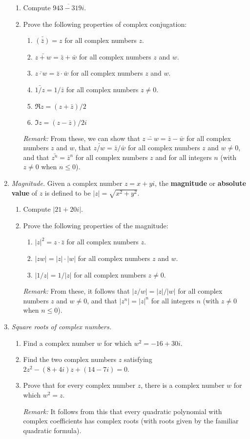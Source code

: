 \begin{enumerate}
\begin{enumerate}
\item Compute $\overline{943 - 319i}$.
\item Prove the following properties of complex conjugation:
\begin{enumerate}
\item $\bar{(\bar{z})} = z$ for all complex numbers $z$.
\item $\bar{z + w} = \bar{z} + \bar{w}$ for all complex numbers $z$ and $w$.
\item $\bar{z\cdot w} = \bar{z}\cdot\bar{w}$ for all complex numbers $z$ and $w$.
\item $\bar{1/z} = 1/\bar{z}$ for all complex numbers $z\neq 0$.
\item $\Re z = (z + \bar{z})/2$
\item $\Im z = (z - \bar{z})/2i$
\end{enumerate}
\emph{Remark:} From these, we can show that $\bar{z - w} = \bar{z} - \bar{w}$ for all complex numbers $z$ and $w$, that $\bar{z/w} = \bar{z}/\bar{w}$ for all complex numbers $z$ and $w\neq 0$, and that $\bar{z^n} = \bar{z}^n$ for all complex numbers $z$ and for all integers $n$ (with $z\neq 0$ when $n\leq 0$).
\end{enumerate}
\item \emph{Magnitude.} Given a complex number $z = x + yi$, the \textbf{magnitude} or \textbf{absolute value} of $z$ is defined to be $\lvert z\rvert = \sqrt{x^2 + y^2}$.
\begin{enumerate}
\item Compute $\lvert 21 + 20i\rvert$.
\item Prove the following properties of the magnitude:
\begin{enumerate}
\item $\lvert z\rvert^2 = z\cdot\bar{z}$ for all complex numbers $z$.
\item $\lvert zw\rvert = \lvert z\rvert\cdot\lvert w\rvert$ for all complex numbers $z$ and $w$.
\item $\lvert 1/z\rvert = 1/\lvert z\rvert$ for all complex numbers $z\neq 0$.
\end{enumerate}
\emph{Remark:} From these, it follows that $\lvert z/w\rvert = \lvert z\rvert / \lvert w\rvert$ for all complex numbers $z$ and $w\neq 0$, and that $\lvert z^n\rvert = \lvert z\rvert^n$ for all integers $n$ (with $z\neq 0$ when $n\leq 0$).
\end{enumerate}
\item \emph{Square roots of complex numbers.}
\begin{enumerate}
\item Find a complex number $w$ for which $w^2 = -16 + 30i$.
\item Find the two complex numbers $z$ satisfying $2z^2 - (8 + 4i)z + (14 - 7i) = 0$.
\item Prove that for every complex number $z$, there is a complex number $w$ for which $w^2 = z$.\par
\emph{Remark:} It follows from this that every quadratic polynomial with complex coefficients has complex roots (with roots given by the familiar quadratic formula).
\end{enumerate}
\end{enumerate}
